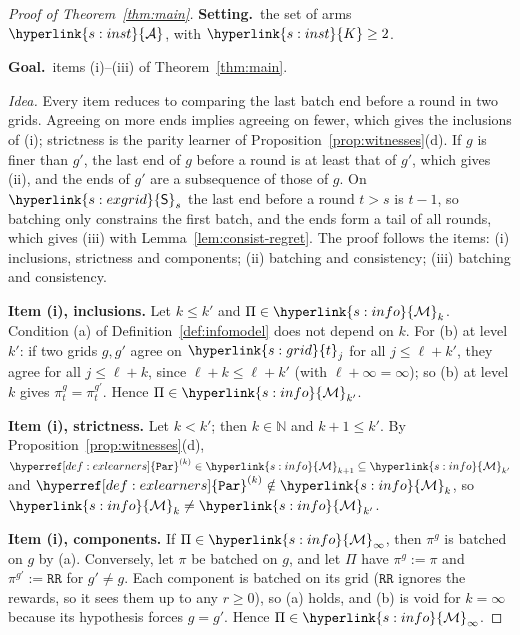 \documentclass[11pt]{article}
\newcommand{\sy}[2]{{\hyperlink{#1}{#2}}}
\newcommand{\1}{\mathbf{1}}
\newcommand{\Nat}{\mathbb{N}}
\newcommand{\Arms}{\sy{s:inst}{\mathcal A}}
\newcommand{\Kar}{\sy{s:inst}{K}}
\newcommand{\tl}{\sy{s:grid}{t}}
\newcommand{\Sq}{\sy{s:exgrid}{\mathsf S}}
\newcommand{\Mk}[1]{\sy{s:info}{\mathcal M}_{#1}}
\newcommand{\RR}{\hyperref[def:exlearners]{\texttt{RR}}}
\newcommand{\Par}{\hyperref[def:exlearners]{\texttt{Par}}}
\newcommand{\Setting}{\noindent\textbf{Setting.}\ }
\newcommand{\Goal}{\par\smallskip\noindent\textbf{Goal.}\ }
\begin{document}
\begin{proof}[Proof of Theorem~\ref{thm:main}]
\Setting the set of arms $\Arms$, with $\Kar\ge2$. \Goal items (i)--(iii) of
Theorem~\ref{thm:main}.

\emph{Idea.} Every item reduces to comparing the last batch end before a round in two grids.
Agreeing on more ends implies agreeing on fewer, which gives the inclusions of (i); strictness is
the parity learner of Proposition~\ref{prop:witnesses}(d). If $g$ is finer than $g'$, the last end
of $g$ before a round is at least that of $g'$, which gives (ii), and the ends of $g'$ are a
subsequence of those of $g$. On $\Sq_s$ the last end before a round $t>s$ is $t-1$, so batching
only constrains the first batch, and the ends form a tail of all rounds, which gives (iii) with
Lemma~\ref{lem:consist-regret}. The proof follows the items: (i) inclusions, strictness and
components; (ii) batching and consistency; (iii) batching and consistency.

\textbf{Item (i), inclusions.} Let $k\le k'$ and $\Pi\in\Mk{k}$. Condition (a) of
Definition~\ref{def:infomodel} does not depend on $k$. For (b) at level $k'$: if two grids $g,g'$
agree on $\tl_j$ for all $j\le\ell+k'$, they agree for all $j\le\ell+k$, since $\ell+k\le\ell+k'$ (with
$\ell+\infty=\infty$); so (b) at level $k$ gives $\pi^g_t=\pi^{g'}_t$. Hence $\Pi\in\Mk{k'}$.

\textbf{Item (i), strictness.} Let $k<k'$; then $k\in\Nat$ and $k+1\le k'$. By
Proposition~\ref{prop:witnesses}(d), $\Par^{(k)}\in\Mk{k+1}\subseteq\Mk{k'}$ and
$\Par^{(k)}\notin\Mk{k}$, so $\Mk{k}\ne\Mk{k'}$.

\textbf{Item (i), components.} If $\Pi\in\Mk{\infty}$, then $\pi^g$ is batched on $g$ by (a). Conversely,
let $\pi$ be batched on $g$, and let $\Pi$ have $\pi^g:=\pi$ and $\pi^{g'}:=\RR$ for $g'\ne g$. Each
component is batched on its grid ($\RR$ ignores the rewards, so it sees them up to any $r\ge0$), so (a)
holds, and (b) is void for $k=\infty$ because its hypothesis forces $g=g'$. Hence $\Pi\in\Mk{\infty}$.


\end{proof}
\end{document}
